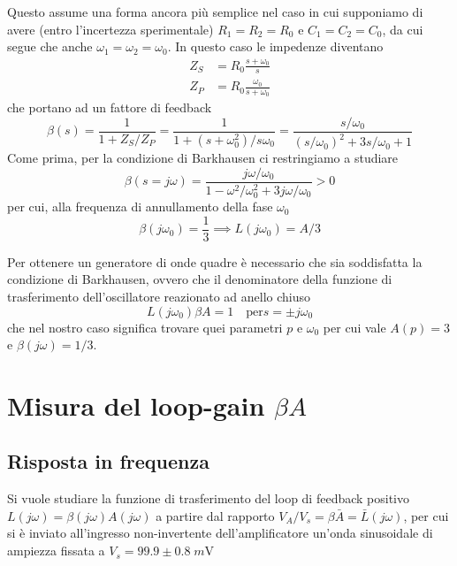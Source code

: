 \documentclass[10pt, a4paper, italian]{article}
\begin{document}
Questo assume una forma ancora più semplice nel caso in cui supponiamo di avere
(entro l'incertezza sperimentale) $R_1 = R_2 = R_0$ e $C_1 = C_2 = C_0$,
da cui segue che anche $\omega_1 = \omega_2 = \omega_0$. In questo caso le
impedenze diventano
\begin{align*}
Z_S &= R_0 \frac{s + \omega_0}{s} \\
Z_P &= R_0 \frac{\omega_0}{s + \omega_0}
\end{align*}
che portano ad un fattore di feedback
\begin{equation}
\beta(s) = \frac{1}{1 + Z_S/Z_P} =
\frac{1}{1 + (s + \omega_0^2)/s \omega_0} =
\frac{s/\omega_0}{(s/\omega_0)^2 + 3s/\omega_0 + 1}
\end{equation}
Come prima, per la condizione di Barkhausen ci restringiamo a studiare
\[
\beta(s = j \omega) = 
\frac{j \omega/\omega_0}{1 - \omega^2/\omega_0^2 + 3j \omega/\omega_0} > 0
\]
per cui, alla frequenza di annullamento della fase $\omega_0$
\begin{equation}\label{eq: loop-gain-approx}
\beta(j \omega_0) = \frac{1}{3} \implies L(j \omega_0) = A/3
\end{equation}

Per ottenere un generatore di onde quadre è necessario che sia soddisfatta la
condizione di Barkhausen, ovvero che il denominatore della funzione di
trasferimento dell'oscillatore reazionato ad anello chiuso
\[
L(j \omega_0)\beta A = 1 \quad \text{per} s = \pm j \omega_0
\]
che nel nostro caso significa trovare quei parametri $p$ e $\omega_0$ per cui
vale $A(p) = 3$ e $\beta(j\omega) = 1/3$.



\section{Misura del loop-gain $\beta A$}

\subsection{Risposta in frequenza}
Si vuole studiare la funzione di trasferimento del loop di feedback positivo
$L(j\omega) = \beta(j\omega) A(j\omega)$ a partire dal rapporto
$V_A/V_s = \beta \bar{A} = \bar{L}(j\omega)$, per cui si è
inviato all'ingresso non-invertente dell'amplificatore un'onda sinusoidale
di ampiezza fissata a $V_s = 99.9 \pm 0.8 \; \si{m\V}$
\end{document}

